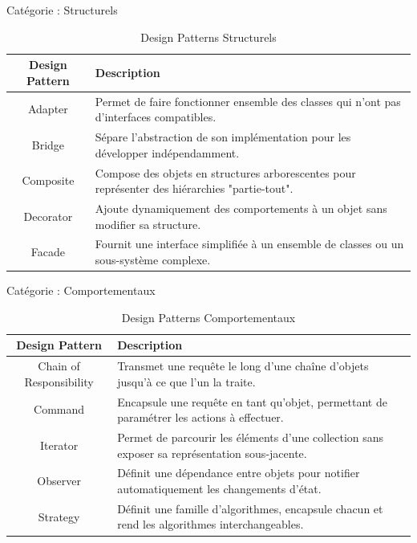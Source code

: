 \documentclass[aspectratio=169]{beamer}
\begin{document}
\begin{frame}{Catégorie : Structurels}
    \begin{table}[]
        \centering
        \begin{tabular}{|c|p{8cm}|}
            \hline
            \textbf{Design Pattern} & \textbf{Description}                                                                           \\ \hline
            Adapter                 & Permet de faire fonctionner ensemble des classes qui n'ont pas d'interfaces compatibles.       \\ \hline
            Bridge                  & Sépare l'abstraction de son implémentation pour les développer indépendamment.                 \\ \hline
            Composite               & Compose des objets en structures arborescentes pour représenter des hiérarchies "partie-tout". \\ \hline
            Decorator               & Ajoute dynamiquement des comportements à un objet sans modifier sa structure.                  \\ \hline
            Facade                  & Fournit une interface simplifiée à un ensemble de classes ou un sous-système complexe.         \\ \hline
        \end{tabular}
        \caption{Design Patterns Structurels}
    \end{table}
\end{frame}

\begin{frame}{Catégorie : Comportementaux}
    \begin{table}[]
        \centering
        \begin{tabular}{|c|p{8cm}|}
            \hline
            \textbf{Design Pattern} & \textbf{Description}                                                                           \\ \hline
            Chain of Responsibility & Transmet une requête le long d'une chaîne d'objets jusqu'à ce que l'un la traite.              \\ \hline
            Command                 & Encapsule une requête en tant qu'objet, permettant de paramétrer les actions à effectuer.      \\ \hline
            Iterator                & Permet de parcourir les éléments d'une collection sans exposer sa représentation sous-jacente. \\ \hline
            Observer                & Définit une dépendance entre objets pour notifier automatiquement les changements d'état.      \\ \hline
            Strategy                & Définit une famille d'algorithmes, encapsule chacun et rend les algorithmes interchangeables.  \\ \hline
        \end{tabular}
        \caption{Design Patterns Comportementaux}
    \end{table}
\end{frame}
\end{document}
